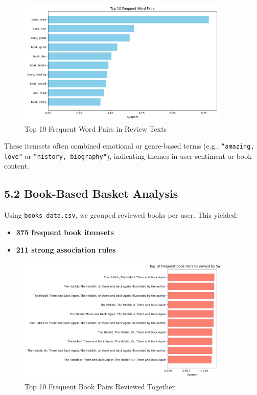 \documentclass{article}
\begin{document}
\begin{figure}[H]
\centering
\includegraphics[width=0.9\textwidth]{images/frequent_word_pairs.png}
\caption{Top 10 Frequent Word Pairs in Review Texts}
\end{figure}

These itemsets often combined emotional or genre-based terms (e.g., \texttt{``amazing, love"} or \texttt{``history, biography"}), indicating themes in user sentiment or book content.

\subsection*{5.2 Book-Based Basket Analysis}
Using \texttt{books\_data.csv}, we grouped reviewed books per user. This yielded:

\begin{itemize}
    \item \textbf{375 frequent book itemsets}
    \item \textbf{211 strong association rules}
\end{itemize}

\begin{figure}[H]
\centering
\includegraphics[width=0.9\textwidth]{images/frequent_book_pairs.png}
\caption{Top 10 Frequent Book Pairs Reviewed Together}
\end{figure}
\end{document}

